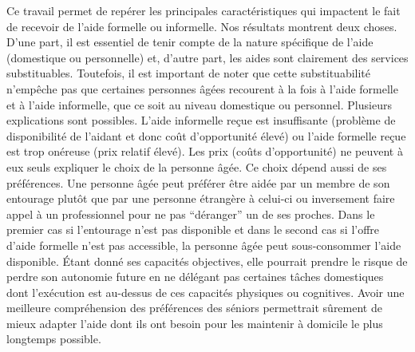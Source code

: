 \begin{Article}
\begin{refsection}[Bonnal]
Ce travail permet de repérer les principales caractéristiques qui impactent le fait de recevoir de l’aide formelle ou informelle. Nos résultats montrent deux choses. D’une part, il est essentiel de tenir compte de la nature spécifique de l’aide (domestique ou personnelle) et, d’autre part, les aides sont clairement des services substituables. Toutefois, il est important de noter que cette substituabilité n’empêche pas que certaines personnes âgées recourent à la fois à l'aide formelle et à l'aide informelle, que ce soit au niveau domestique ou personnel. Plusieurs explications sont possibles. L’aide informelle reçue est insuffisante (problème de disponibilité de l’aidant et donc coût d'opportunité élevé) ou l’aide formelle reçue est trop onéreuse (prix relatif élevé). Les prix (coûts d'opportunité) ne peuvent à eux seuls expliquer le choix de la personne âgée. Ce choix dépend aussi de ses préférences. Une personne âgée peut préférer être aidée par un membre de son entourage plutôt que par une personne étrangère à celui-ci ou inversement faire appel à un professionnel pour ne pas \enquote{déranger} un de ses proches. Dans le premier cas si l'entourage n'est pas disponible et dans le second cas si l'offre d'aide formelle n'est pas accessible, la personne âgée peut sous-consommer l'aide disponible. \'Etant donné ses capacités objectives, elle pourrait prendre le risque de perdre son autonomie future en ne délégant pas certaines tâches domestiques dont l'exécution est au-dessus de ces capacités physiques ou cognitives. Avoir une meilleure compréhension des préférences des séniors permettrait sûrement de mieux adapter l’aide dont ils ont besoin pour les maintenir à domicile le plus longtemps possible.

%
%
%
%
%
%

\begingroup\sloppy\setlength{\emergencystretch}{3em}
\printbibliography
\endgroup


\end{refsection}
\end{Article}
